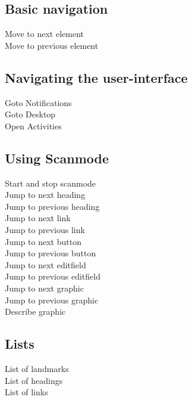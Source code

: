 \documentclass[a4paper, landscape, 11pt]{scrartcl}
\newcommand{\command}[2]{#1~\dotfill{}~#2\\} %
\begin{document}
\begin{multicols}{2}
\subsection*{Basic navigation}
\command{Move to next element}{}
\command{Move to previous element}{}

\subsection*{Navigating the user-interface}
\command{Goto Notifications}{}
\command{Goto Desktop}{}
\command{Open Activities}{}

\subsection*{Using Scanmode}
\command{Start and stop scanmode}{}
\command{Jump to next heading}{}
\command{Jump to previous heading}{}
\command{Jump to next link}{}
\command{Jump to previous link}{\keys{\shift + h}}
\command{Jump to next button}{}
\command{Jump to previous button}{}
\command{Jump to next editfield}{}
\command{Jump to previous editfield}{}
\command{Jump to next graphic}{}
\command{Jump to previous graphic}{}
\command{Describe graphic}{}

\subsection*{Lists}
\command{List of landmarks}{}
\command{List of headings}{}
\command{List of links}{}

\end{multicols}

\hrulefill{}
\end{document}
